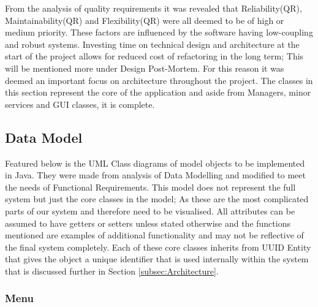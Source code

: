 From the analysis of quality requirements it was revealed that Reliability(QR), Maintainability(QR) and Flexibility(QR) were all deemed to be of high or medium priority. These factors are influenced by the software having low-coupling and robust systems. Investing time on technical design and architecture at the start of the project allows for reduced cost of refactoring in the long term; This will be mentioned more under Design Post-Mortem. For this reason it was deemed an important focus on architecture throughout the project. The classes in this section represent the core of the application and aside from Managers, minor services and GUI classes, it is complete.

\subsection{Data Model} \label{subsec:DataModel}
Featured below is the UML Class diagrams of model objects to be implemented in Java. They were made from analysis of Data Modelling and modified to meet the needs of Functional Requirements. This model does not represent the full system but just the core classes in the model; As these are the most complicated parts of our system and therefore need to be visualised. All attributes can be assumed to have getters or setters unless stated otherwise and the functions mentioned are examples of additional functionality and may not be reflective of the final system completely.
Each of these core classes inherits from UUID Entity that gives the object a unique identifier that is used internally within the system that is discussed further in Section \ref{subsec:Architecture}.

\subsubsection{Menu}


